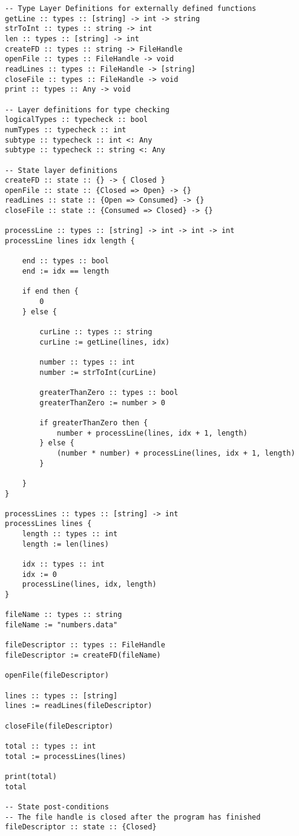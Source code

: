 \begin{lstlisting}
-- Type Layer Definitions for externally defined functions
getLine :: types :: [string] -> int -> string
strToInt :: types :: string -> int
len :: types :: [string] -> int
createFD :: types :: string -> FileHandle
openFile :: types :: FileHandle -> void
readLines :: types :: FileHandle -> [string]
closeFile :: types :: FileHandle -> void
print :: types :: Any -> void

-- Layer definitions for type checking
logicalTypes :: typecheck :: bool
numTypes :: typecheck :: int
subtype :: typecheck :: int <: Any
subtype :: typecheck :: string <: Any

-- State layer definitions
createFD :: state :: {} -> { Closed }
openFile :: state :: {Closed => Open} -> {}
readLines :: state :: {Open => Consumed} -> {}
closeFile :: state :: {Consumed => Closed} -> {}

processLine :: types :: [string] -> int -> int -> int
processLine lines idx length {

    end :: types :: bool
    end := idx == length

    if end then {
        0
    } else {

        curLine :: types :: string
        curLine := getLine(lines, idx)

        number :: types :: int
        number := strToInt(curLine)

        greaterThanZero :: types :: bool
        greaterThanZero := number > 0

        if greaterThanZero then {
            number + processLine(lines, idx + 1, length)
        } else {
            (number * number) + processLine(lines, idx + 1, length)
        }

    }
}

processLines :: types :: [string] -> int
processLines lines {
    length :: types :: int
    length := len(lines)

    idx :: types :: int
    idx := 0
    processLine(lines, idx, length)
}

fileName :: types :: string
fileName := "numbers.data"

fileDescriptor :: types :: FileHandle
fileDescriptor := createFD(fileName)

openFile(fileDescriptor)

lines :: types :: [string]
lines := readLines(fileDescriptor)

closeFile(fileDescriptor)

total :: types :: int
total := processLines(lines)

print(total)
total

-- State post-conditions
-- The file handle is closed after the program has finished
fileDescriptor :: state :: {Closed}
\end{lstlisting}

